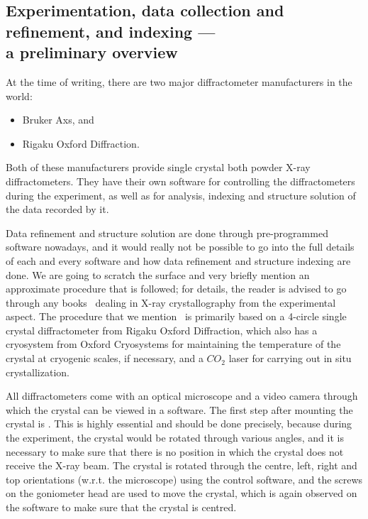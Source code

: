 \subsection[Data collection and indexing (an overview)]{Experimentation, data collection and refinement, and indexing --- \\a preliminary overview}

At the time of writing, there are two major diffractometer manufacturers in the world:%
%	
	\begin{itemize}%
%	
	    \item Bruker Axs, and
	    
	    \item Rigaku Oxford Diffraction.
	    
	\end{itemize}
	
Both of these manufacturers provide single crystal both powder X-ray diffractometers. They have their own software for controlling the diffractometers during the experiment, as well as for analysis, indexing and structure solution of the data recorded by it.

Data refinement and structure solution are done through pre-programmed software nowadays, and it would really not be possible to go into the full details of each and every software and how data refinement and structure indexing are done. We are going to scratch the surface and very briefly mention an approximate procedure that is followed; for details, the reader is advised to go through any books~\cite{Cullity2014} dealing in X-ray crystallography from the experimental aspect. The procedure that we mention~\cite{Chowdhury2022} is primarily based on a 4-circle single crystal diffractometer from Rigaku Oxford Diffraction, which also has a cryosystem from Oxford Cryosystems for maintaining the temperature of the crystal at cryogenic scales, if necessary, and a $CO_2$ laser for carrying out in situ crystallization.

All diffractometers come with an optical microscope and a video camera through which the crystal can be viewed in a software. The first step after mounting the crystal is . This is highly essential and should be done precisely, because during the experiment, the crystal would be rotated through various angles, and it is necessary to make sure that there is no position in which the crystal does not receive the X-ray beam. The crystal is rotated through the centre, left, right and top orientations (w.r.t. the microscope) using the control software, and the screws on the goniometer head are used to move the crystal, which is again observed on the software to make sure that the crystal is centred.

